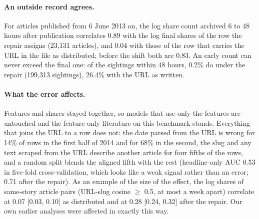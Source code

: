 \documentclass[10pt,a4paper,twocolumn]{article}
\begin{document}
\paragraph{An outside record agrees.} For articles published from 6 June 2013 on, the log share count archived 6
to 48 hours after publication correlates 0.89 with the log final shares of the row the repair assigns (23{,}131
articles), and 0.04 with those of the row that carries the URL in the file as distributed; before the shift both
are 0.83. An early count can never exceed the final one: of the sightings within 48 hours, 0.2\% do under the
repair (199{,}313 sightings), 26.4\% with the URL as written.

\paragraph{What the error affects.} Features and shares stayed together, so models that use only the
features are untouched and the feature-only literature on this benchmark stands. Everything that joins the
URL to a row does not: the date parsed from the URL is wrong for 14\% of rows in the first half of 2014 and for
68\% in the second, the slug and any text scraped from the URL describe another article for four fifths of the
rows, and a random split blends the aligned fifth with the rest (headline-only AUC 0.53 in five-fold
cross-validation, which looks like a weak signal rather than an error; 0.71 after the repair). As an example of
the size of the effect, the log shares of same-story article pairs (URL-slug cosine $\ge$ 0.5, at most a week
apart) correlate at 0.07 [0.03, 0.10] as distributed and at 0.28 [0.24, 0.32] after the repair. Our own earlier
analyses were affected in exactly this way.
\end{document}
